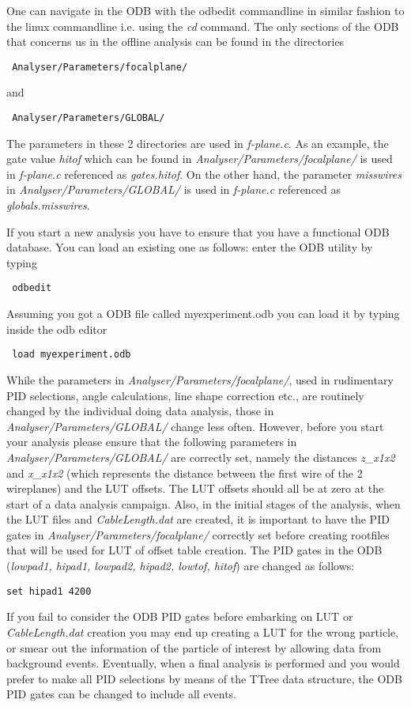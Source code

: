 \documentclass[11pt]{report}
\begin{document}
One can navigate in the ODB with the odbedit commandline in similar fashion to the linux commandline
i.e. using the {\it cd} command.
The only sections of the ODB that concerns us in the offline analysis can be found in 
the directories 
\begin{verbatim} Analyser/Parameters/focalplane/ \end{verbatim}
and  
\begin{verbatim} Analyser/Parameters/GLOBAL/\end{verbatim}
The parameters in these 2 directories are used in {\it f-plane.c}.
As an example, the gate value {\it hitof} which can be found in 
{\it Analyser/Parameters/focalplane/} is used in {\it f-plane.c} referenced as
{\it gates.hitof}. On the other hand, the parameter {\it misswires} 
in {\it Analyser/Parameters/GLOBAL/} is used in {\it f-plane.c} referenced as
{\it globals.misswires}. 

If you start a new analysis you have to ensure that you have a functional ODB database.
You can load an existing one as follows:
enter the ODB utility by typing
\begin{verbatim} odbedit \end{verbatim}
Assuming you got a ODB file called myexperiment.odb you can load it
by typing inside the odb editor
\begin{verbatim} load myexperiment.odb \end{verbatim}

While the parameters in {\it Analyser/Parameters/focalplane/},
used in rudimentary PID selections, angle calculations, line shape correction etc.,
are routinely changed by the individual doing data analysis, those in 
{\it Analyser/Parameters/GLOBAL/} change less often.
However, before you start your analysis please ensure that the following parameters
in {\it Analyser/Parameters/GLOBAL/} are correctly set, namely the distances {\it z\_x1x2} and
{\it x\_x1x2} (which represents the distance between the first wire of the 2 wireplanes) and the LUT 
offsets. The LUT offsets should all be at zero at the start of a data analysis campaign.
Also, in the initial stages of the analysis, when the LUT files and {\it CableLength.dat} are created,
it is important to have the PID gates in 
{\it Analyser/Parameters/focalplane/} 
correctly set before creating rootfiles that will be used for LUT of offset table creation.
The PID gates in the ODB ({\it lowpad1, hipad1, lowpad2, hipad2, lowtof, hitof}) are 
changed as follows:
\begin{verbatim} 
set hipad1 4200
\end{verbatim} 
If you fail to consider the ODB PID gates before embarking on LUT or {\it CableLength.dat}  creation 
you may end up creating a LUT for
the wrong particle, or smear out the information of the particle of interest by allowing
data from background events. Eventually, when a final analysis is performed and you would prefer
to make all PID selections by means of the TTree data structure, the ODB PID gates can be
changed to include all events.
\end{document}
